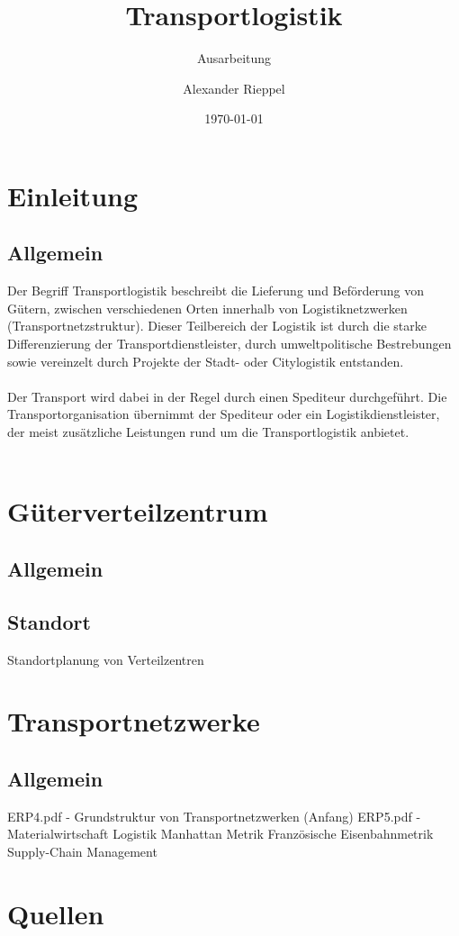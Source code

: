 \documentclass[a4paper,12pt]{scrreprt}
\begin{document}
\author{Alexander Rieppel} %
\title{Transportlogistik} %
\subject{Betriebs- und Informationsmanagement} %
\subtitle{Ausarbeitung} %
\date{\today} %
\publishers{5AHITT} %

\maketitle
\tableofcontents


\chapter{Einleitung}
\section{Allgemein}
	Der Begriff Transportlogistik beschreibt die Lieferung und Beförderung von Gütern, zwischen verschiedenen Orten innerhalb von Logistiknetzwerken (Transportnetzstruktur). Dieser Teilbereich der Logistik ist durch die starke Differenzierung der Transportdienstleister, durch umweltpolitische Bestrebungen sowie vereinzelt durch Projekte der Stadt- oder Citylogistik entstanden.\\\\
	Der Transport wird dabei in der Regel durch einen Spediteur durchgeführt. Die Transportorganisation übernimmt der Spediteur oder ein Logistikdienstleister, der meist zusätzliche Leistungen rund um die Transportlogistik anbietet.\\\\
	
	\chapter{Güterverteilzentrum}
	\section{Allgemein}
	\section{Standort}
	Standortplanung von Verteilzentren
	\chapter{Transportnetzwerke}
	\section{Allgemein}
	ERP4.pdf - Grundstruktur von Transportnetzwerken (Anfang)
	ERP5.pdf - Materialwirtschaft Logistik
	Manhattan Metrik
	Französische Eisenbahnmetrik
	Supply-Chain Management
	
\chapter{Quellen}
\end{document}
